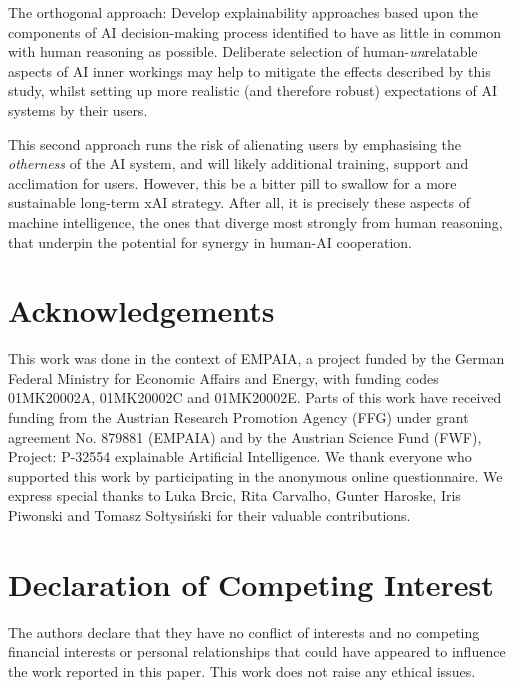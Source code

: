 \documentclass[final,5p,times,twocolumn,hyphens]{elsarticle}
\begin{document}
The orthogonal approach: Develop explainability approaches based upon the components of AI decision-making process identified to have as little in common with human reasoning as possible. Deliberate selection of human-\textit{un}relatable aspects of AI inner workings may help to mitigate the effects described by this study, whilst setting up more realistic (and therefore robust) expectations of AI systems by their users. 

This second approach runs the risk of alienating users by emphasising the \textit{otherness} of the AI system, and will likely additional training, support and acclimation for users. However, this be a bitter pill to swallow for a more sustainable long-term xAI strategy. After all, it is precisely these aspects of machine intelligence, the ones that diverge most strongly from human reasoning, that underpin the potential for synergy in human-AI cooperation.

\section*{Acknowledgements}

This work was done in the context of EMPAIA, a project funded by the German Federal Ministry for Economic Affairs and Energy, with funding codes 01MK20002A, 01MK20002C and 01MK20002E. Parts of this work have received funding from the Austrian Research Promotion Agency (FFG) under grant agreement No. 879881 (EMPAIA) and by the Austrian Science Fund (FWF), Project: P-32554 explainable Artificial Intelligence. We thank everyone who supported this work by participating in the anonymous online questionnaire. We express special thanks to Luka Brcic, Rita Carvalho, Gunter Haroske, Iris Piwonski and Tomasz Sołtysiński for their valuable contributions. 

\section*{Declaration of Competing Interest}

The authors declare that they have no conflict of interests and no competing financial interests or personal relationships that could have appeared to influence the work reported in this paper. This work does not raise any ethical issues.


\end{document}
